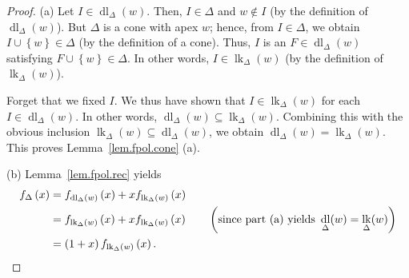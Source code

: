 \documentclass[12pt]{amsart}
\theoremstyle{definition}
\DeclareMathOperator{\lk}{lk}
\DeclareMathOperator{\dl}{dl}
\newcommand{\set}[1]{\left\{ #1 \right\}}
\newcommand{\tup}[1]{\left( #1 \right)}
\begin{document}
\begin{proof}
(a) Let $I \in \dl_\Delta(w)$. Then, $I \in \Delta$ and $w \notin I$
(by the definition of $\dl_\Delta(w)$).
But $\Delta$ is a cone with apex $w$; hence, from $I \in \Delta$,
we obtain $I \cup \set{w} \in \Delta$ (by the definition of a cone).
Thus, $I$ is an $F \in \dl_\Delta(w)$ satisfying $F \cup \set{w} \in \Delta$.
In other words, $I \in \lk_\Delta(w)$ (by the definition of $\lk_\Delta(w)$).

Forget that we fixed $I$.
We thus have shown that $I \in \lk_\Delta(w)$ for each $I \in \dl_\Delta(w)$.
In other words, $\dl_\Delta(w) \subseteq \lk_\Delta(w)$.
Combining this with the obvious inclusion $\lk_\Delta(w) \subseteq \dl_\Delta(w)$,
we obtain $\dl_\Delta(w) = \lk_\Delta(w)$.
This proves Lemma~\ref{lem.fpol.cone} (a).

(b) Lemma~\ref{lem.fpol.rec} yields
\begin{align*}
f_{\Delta}\tup{x}
&= f_{\dl_\Delta(w)}\tup{x} + x f_{\lk_\Delta(w)}\tup{x} \\
&= f_{\lk_\Delta(w)}\tup{x} + x f_{\lk_\Delta(w)}\tup{x}
\qquad \tup{\text{since part (a) yields } \dl_\Delta(w) = \lk_\Delta(w) } \\
&= \tup{1+x} f_{\lk_\Delta(w)}\tup{x} . \qedhere
\end{align*}
\end{proof}
\end{document}
